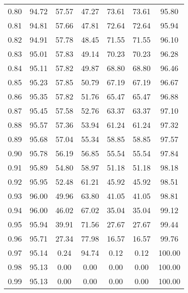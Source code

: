 \begin{tabular}{|c|c|c|c|c|c|c|}
      0.80 &     94.72 &     57.57 &      47.27 &   73.61 &      73.61 &         95.80 \\
      0.81 &     94.81 &     57.66 &      47.81 &   72.64 &      72.64 &         95.94 \\
      0.82 &     94.91 &     57.78 &      48.45 &   71.55 &      71.55 &         96.10 \\
      0.83 &     95.01 &     57.83 &      49.14 &   70.23 &      70.23 &         96.28 \\
      0.84 &     95.11 &     57.82 &      49.87 &   68.80 &      68.80 &         96.46 \\
      0.85 &     95.23 &     57.85 &      50.79 &   67.19 &      67.19 &         96.67 \\
      0.86 &     95.35 &     57.82 &      51.76 &   65.47 &      65.47 &         96.88 \\
      0.87 &     95.45 &     57.58 &      52.76 &   63.37 &      63.37 &         97.10 \\
      0.88 &     95.57 &     57.36 &      53.94 &   61.24 &      61.24 &         97.32 \\
      0.89 &     95.68 &     57.04 &      55.34 &   58.85 &      58.85 &         97.57 \\
      0.90 &     95.78 &     56.19 &      56.85 &   55.54 &      55.54 &         97.84 \\
      0.91 &     95.89 &     54.80 &      58.97 &   51.18 &      51.18 &         98.18 \\
      0.92 &     95.95 &     52.48 &      61.21 &   45.92 &      45.92 &         98.51 \\
      0.93 &     96.00 &     49.96 &      63.80 &   41.05 &      41.05 &         98.81 \\
      0.94 &     96.00 &     46.02 &      67.02 &   35.04 &      35.04 &         99.12 \\
      0.95 &     95.94 &     39.91 &      71.56 &   27.67 &      27.67 &         99.44 \\
      0.96 &     95.71 &     27.34 &      77.98 &   16.57 &      16.57 &         99.76 \\
      0.97 &     95.14 &      0.24 &      94.74 &    0.12 &       0.12 &        100.00 \\
      0.98 &     95.13 &      0.00 &       0.00 &    0.00 &       0.00 &        100.00 \\
      0.99 &     95.13 &      0.00 &       0.00 &    0.00 &       0.00 &        100.00 \\
\bottomrule
\end{tabular}
